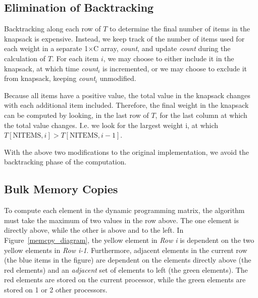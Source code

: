\documentclass[11pt]{article} %
\begin{document}
\subsection{Elimination of Backtracking}

Backtracking along each row of $T$ to determine the final number of items in the knapsack is expensive. Instead, we keep track of the number of items used for each weight in a separate 1$\times$C array, \emph{count}, and update \emph{count} during the calculation of $T$. For each item $i$, we may choose to either include it in the knapsack, at which time \emph{count}$_i$ is incremented, or we may choose to exclude it from knapsack, keeping \emph{count}$_i$ unmodified.

Because all items have a positive value, the total value in the knapsack changes with each additional item included. Therefore, the final weight in the knapsack can be computed by looking, in the last row of $T$, for the last column at which the total value changes. I.e. we look for the largest weight i, at which $T[\text{NITEMS}, i] > T[\text{NITEMS}, i-1]$.

With the above two modifications to the original implementation, we avoid the backtracking phase of the computation.

\subsection{Bulk Memory Copies}

To compute each element in the dynamic programming matrix, the algorithm must take the maximum of two values in the row above. The one element is directly above, while the other is above and to the left. In Figure~\ref{memcpy_diagram}, the yellow element in \emph{Row i} is dependent on the two yellow elements in \emph{Row i-1}. Furthermore, adjacent elements in the current row (the blue items in the figure) are dependent on the elements directly above (the red elements) and an \emph{adjacent} set of elements to left (the green elements). The red elements are stored on the current processor, while the green elements are stored on 1 or 2 other processors.
\end{document}
